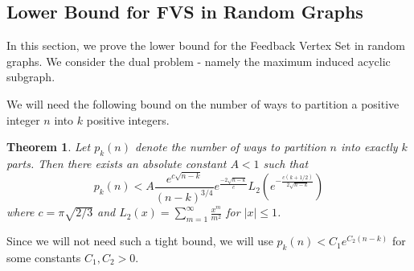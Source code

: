\documentclass[11pt]{article}
\newtheorem{theorem}{Theorem}
\begin{document}
\subsection{Lower Bound for FVS in Random Graphs}
In this section, we prove the lower bound for the Feedback Vertex Set in random graphs. We consider the dual problem - namely the maximum induced acyclic subgraph.

We will need the following bound on the number of ways to partition a positive integer $n$ into $k$ positive integers.
\begin{theorem}\label{theorem:partition-function}\cite{wladimir-partition-function}
Let $p_k(n)$ denote the number of ways to partition $n$ into exactly $k$ parts. Then there exists an absolute constant $A<1$ such that
\[
p_k(n)<A\frac{e^{c\sqrt{n-k}}}{(n-k)^{3/4}}e^{\frac{-2\sqrt{n-k}}{c}}L_2(e^{-\frac{c(k+1/2)}{2\sqrt{n-k}}})
\]
where $c=\pi\sqrt{2/3}$ and $L_2(x)=\sum_{m=1}^{\infty}\frac{x^m}{m^2}$ for $|x|\leq 1$.
\end{theorem}
 Since we will not need such a tight bound, we will use $p_k(n)< C_1e^{C_2(n-k)}$ for some constants $C_1,C_2>0$.
\end{document}
